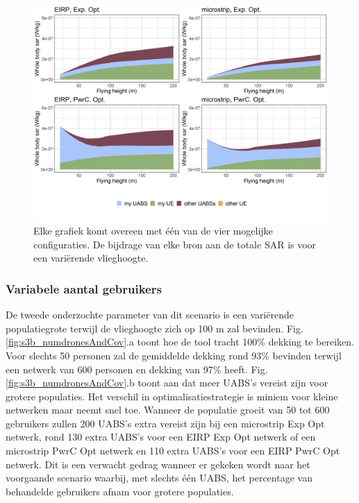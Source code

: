 \documentclass[twocolumn]{phdsymp_dutch}
\begin{document}
\begin{figure}[h!]
  \includegraphics[width=\linewidth]{../results/s3/fhFourSources.png}
  \caption{Elke grafiek komt overeen met \'e\'en van de vier mogelijke configuraties.
   De bijdrage van elke bron aan de totale \acs{SAR} is voor een variërende vlieghoogte.}
  \label{fig:s3a_fourSourcesMatrix}
\end{figure}

\subsubsection{Variabele aantal gebruikers}
De tweede onderzochte parameter van dit scenario is een vari\"erende populatiegrote
terwijl de vlieghoogte zich op 100 m zal bevinden.
Fig.  \ref{fig:s3b_numdronesAndCov}.a toont hoe de tool tracht 100\% dekking te bereiken.
Voor slechts 50 personen zal de gemiddelde dekking
 rond 93\% bevinden terwijl een netwerk van 600 personen en dekking van 97\% heeft.
Fig. \ref{fig:s3b_numdronesAndCov}.b toont aan dat meer \gls{UABS}'s  vereist zijn voor grotere populaties.
Het verschil in optimalisatiestrategie is miniem voor kleine netwerken maar neemt snel toe. 
Wanneer de populatie groeit van 50 tot 600 gebruikers zullen 200 \gls{UABS}'s extra vereist zijn bij een
 microstrip \gls{Exp Opt} netwerk,
 rond 130 extra \gls{UABS}'s voor een \gls{EIRP} \gls{Exp Opt} netwerk of een microstrip \gls{PwrC Opt} netwerk
 en 110 extra \gls{UABS}'s voor een \gls{EIRP} \gls{PwrC Opt} netwerk.
Dit is een verwacht gedrag wanneer er gekeken wordt naar het voorgaande scenario waarbij,
 met slechts \'e\'en \gls{UABS}, het percentage van behandelde gebruikers afnam voor grotere populaties.
\end{document}
